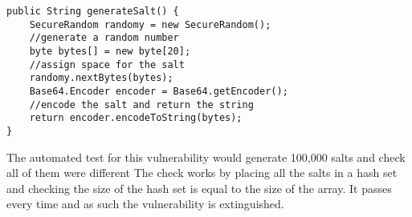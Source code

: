 \begin{verbatim}
public String generateSalt() {
    SecureRandom randomy = new SecureRandom();
    //generate a random number
    byte bytes[] = new byte[20];
    //assign space for the salt
    randomy.nextBytes(bytes);
    Base64.Encoder encoder = Base64.getEncoder();
    //encode the salt and return the string
    return encoder.encodeToString(bytes);
}
\end{verbatim}
The automated test for this vulnerability would generate 100,000 salts and check all of them were different The check works by placing all the salts in a hash set and checking the
size of the hash set is equal to the size of the array. It passes every time and as such the vulnerability is extinguished.
